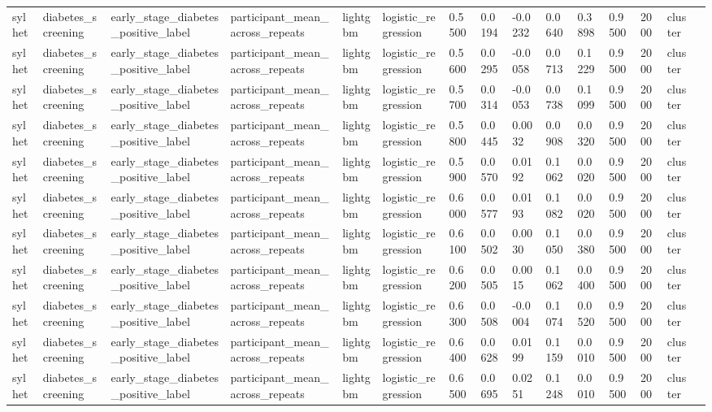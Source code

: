 \begin{tabular}{lllllllllllllll}
sylhet & diabetes\_screening & early\_stage\_diabetes\_positive\_label & participant\_mean\_across\_repeats & lightgbm & logistic\_regression & 0.5500 & 0.0194 & -0.0232 & 0.0640 & 0.3898 & 0.9500 & 2000 & cluster &  \\
sylhet & diabetes\_screening & early\_stage\_diabetes\_positive\_label & participant\_mean\_across\_repeats & lightgbm & logistic\_regression & 0.5600 & 0.0295 & -0.0058 & 0.0713 & 0.1229 & 0.9500 & 2000 & cluster &  \\
sylhet & diabetes\_screening & early\_stage\_diabetes\_positive\_label & participant\_mean\_across\_repeats & lightgbm & logistic\_regression & 0.5700 & 0.0314 & -0.0053 & 0.0738 & 0.1099 & 0.9500 & 2000 & cluster &  \\
sylhet & diabetes\_screening & early\_stage\_diabetes\_positive\_label & participant\_mean\_across\_repeats & lightgbm & logistic\_regression & 0.5800 & 0.0445 & 0.0032 & 0.0908 & 0.0320 & 0.9500 & 2000 & cluster &  \\
sylhet & diabetes\_screening & early\_stage\_diabetes\_positive\_label & participant\_mean\_across\_repeats & lightgbm & logistic\_regression & 0.5900 & 0.0570 & 0.0192 & 0.1062 & 0.0020 & 0.9500 & 2000 & cluster &  \\
sylhet & diabetes\_screening & early\_stage\_diabetes\_positive\_label & participant\_mean\_across\_repeats & lightgbm & logistic\_regression & 0.6000 & 0.0577 & 0.0193 & 0.1082 & 0.0020 & 0.9500 & 2000 & cluster &  \\
sylhet & diabetes\_screening & early\_stage\_diabetes\_positive\_label & participant\_mean\_across\_repeats & lightgbm & logistic\_regression & 0.6100 & 0.0502 & 0.0030 & 0.1050 & 0.0380 & 0.9500 & 2000 & cluster &  \\
sylhet & diabetes\_screening & early\_stage\_diabetes\_positive\_label & participant\_mean\_across\_repeats & lightgbm & logistic\_regression & 0.6200 & 0.0505 & 0.0015 & 0.1062 & 0.0400 & 0.9500 & 2000 & cluster &  \\
sylhet & diabetes\_screening & early\_stage\_diabetes\_positive\_label & participant\_mean\_across\_repeats & lightgbm & logistic\_regression & 0.6300 & 0.0508 & -0.0004 & 0.1074 & 0.0520 & 0.9500 & 2000 & cluster &  \\
sylhet & diabetes\_screening & early\_stage\_diabetes\_positive\_label & participant\_mean\_across\_repeats & lightgbm & logistic\_regression & 0.6400 & 0.0628 & 0.0199 & 0.1159 & 0.0010 & 0.9500 & 2000 & cluster &  \\
sylhet & diabetes\_screening & early\_stage\_diabetes\_positive\_label & participant\_mean\_across\_repeats & lightgbm & logistic\_regression & 0.6500 & 0.0695 & 0.0251 & 0.1248 & 0.0010 & 0.9500 & 2000 & cluster &  \\

\end{tabular}
